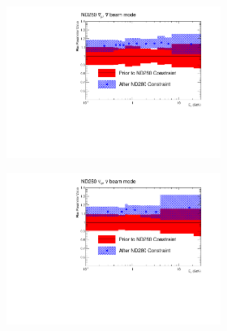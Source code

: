 \begin{figure}[h]
\begin{subfigure}[t]{\textwidth}
\begin{subfigure}[t]{0.24\textwidth}
	\includegraphics[width=\textwidth, trim={0mm 0mm 20mm 0mm}, clip]{figures/official/nd_nf_numub_flux_parms_bias_01}
\end{subfigure}
\begin{subfigure}[t]{0.24\textwidth}
	\includegraphics[width=\textwidth, trim={0mm 0mm 20mm 0mm}, clip]{figures/official/nd_nf_nueb_flux_parms_bias_01}
\end{subfigure}
\begin{subfigure}[t]{0.24\textwidth}

\end{subfigure}
\end{subfigure}
\end{figure}
